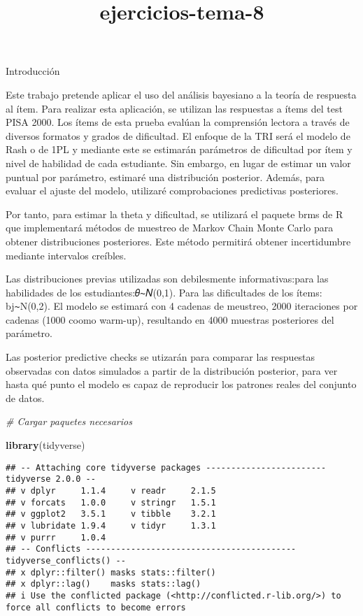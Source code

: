 \documentclass[
]{article}
\title{ejercicios-tema-8}
\author{}
\date{\vspace{-2.5em}}
\newenvironment{Shaded}{\begin{snugshade}}{\end{snugshade}}
\newcommand{\CommentTok}[1]{\textcolor[rgb]{0.56,0.35,0.01}{\textit{#1}}}
\newcommand{\FunctionTok}[1]{\textcolor[rgb]{0.13,0.29,0.53}{\textbf{#1}}}
\newcommand{\NormalTok}[1]{#1}
\begin{document}
\maketitle

Introducción

Este trabajo pretende aplicar el uso del análisis bayesiano a la teoría
de respuesta al ítem. Para realizar esta aplicación, se utilizan las
respuestas a ítems del test PISA 2000. Los ítems de esta prueba evalúan
la comprensión lectora a través de diversos formatos y grados de
dificultad. El enfoque de la TRI será el modelo de Rash o de 1PL y
mediante este se estimarán parámetros de dificultad por ítem y nivel de
habilidad de cada estudiante. Sin embargo, en lugar de estimar un valor
puntual por parámetro, estimaré una distribución posterior. Además, para
evaluar el ajuste del modelo, utilizaré comprobaciones predictivas
posteriores.

Por tanto, para estimar la theta y dificultad, se utilizará el paquete
brms de R que implementará métodos de muestreo de Markov Chain Monte
Carlo para obtener distribuciones posteriores. Este método permitirá
obtener incertidumbre mediante intervalos creíbles.

Las distribuciones previas utilizadas son debilesmente informativas:para
las habilidades de los estudiantes:𝜃∼𝑁(0,1). Para las dificultades de
los ítems: bj∼N(0,2). El modelo se estimará con 4 cadenas de meustreo,
2000 iteraciones por cadenas (1000 coomo warm-up), resultando en 4000
muestras posteriores del parámetro.

Las posterior predictive checks se utizarán para comparar las respuestas
observadas con datos simulados a partir de la distribución posterior,
para ver hasta qué punto el modelo es capaz de reproducir los patrones
reales del conjunto de datos.

\begin{Shaded}
\begin{Highlighting}[]
\CommentTok{\# Cargar paquetes necesarios}

\FunctionTok{library}\NormalTok{(tidyverse)}
\end{Highlighting}
\end{Shaded}

\begin{verbatim}
## -- Attaching core tidyverse packages ------------------------ tidyverse 2.0.0 --
## v dplyr     1.1.4     v readr     2.1.5
## v forcats   1.0.0     v stringr   1.5.1
## v ggplot2   3.5.1     v tibble    3.2.1
## v lubridate 1.9.4     v tidyr     1.3.1
## v purrr     1.0.4     
## -- Conflicts ------------------------------------------ tidyverse_conflicts() --
## x dplyr::filter() masks stats::filter()
## x dplyr::lag()    masks stats::lag()
## i Use the conflicted package (<http://conflicted.r-lib.org/>) to force all conflicts to become errors
\end{verbatim}
\end{document}
